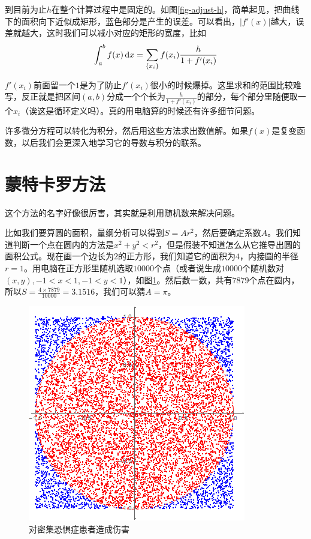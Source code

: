 到目前为止$h$在整个计算过程中是固定的。如图\ref{fig-adjust-h}，简单起见，把曲线下的面积向下近似成矩形，蓝色部分是产生的误差。可以看出，$|f'(x)|$越大，误差就越大，这时我们可以减小对应的矩形的宽度，比如
\begin{equation*}
\int_a^b f(x) \mathop{}\!\mathrm{d} x=\sum_{\{x_i\}} f(x_i) \frac{h}{1+f'(x_i)}
\end{equation*}

$f'(x_i)$前面留一个$1$是为了防止$f'(x_i)$很小的时候爆掉。这里求和的范围比较难写，反正就是把区间$(a,b)$分成一个个长为$\frac{h}{1+f'(x_i)}$的部分，每个部分里随便取一个$x_i$（诶这是循环定义吗）。真的用电脑算的时候还有许多细节问题。

许多微分方程可以转化为积分，然后用这些方法求出数值解。如果$f(x)$是复变函数，以后我们会更深入地学习它的导数与积分的联系。
\section{蒙特卡罗方法}
这个方法的名字好像很厉害，其实就是利用随机数来解决问题。

比如我们要算圆的面积，量纲分析可以得到$S=A r^2$，然后要确定系数$A$。我们知道判断一个点在圆内的方法是$x^2+y^2<r^2$，但是假装不知道怎么从它推导出圆的面积公式。现在画一个边长为$2$的正方形，我们知道它的面积为$4$，内接圆的半径$r=1$。用电脑在正方形里随机选取$10000$个点（或者说生成$10000$个随机数对$(x,y),-1<x<1,-1<y<1$），如图\ref{fig-monte-carlo-circle}。然后数一数，共有$7879$个点在圆内，所以$S=\frac{4 \times 7879}{10000}=3.1516$，我们可以猜$A=\pi$。
\begin{figure}[htb]
\centering
\includegraphics[scale=0.5]{fig/monte-carlo-circle}
\caption{对密集恐惧症患者造成伤害}
\label{fig-monte-carlo-circle}
\end{figure}

